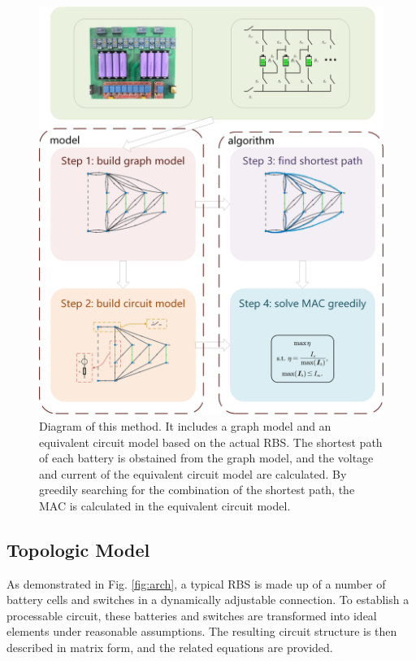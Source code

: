 \documentclass{article}
\begin{document}
\begin{figure}
    \centering
    \includegraphics[width=\textwidth]{../attachments/main-v4.png}
    \caption{Diagram of this method. 
        It includes a graph model and an equivalent circuit model based on the actual RBS.
        The shortest path of each battery is obstained from the graph model, and the voltage and current of the equivalent circuit model are calculated.
        By greedily searching for the combination of the shortest path, the MAC is calculated in the equivalent circuit model.
        } 
    \label{fig:main}
\end{figure}

\subsection{Topologic Model}

As demonstrated in Fig. \ref{fig:arch}, a typical RBS is made up of a number of battery cells and switches in a dynamically adjustable connection.
To establish a processable circuit, these batteries and switches are transformed into ideal elements under reasonable assumptions.
The resulting circuit structure is then described in matrix form, and the related equations are provided.
\end{document}
